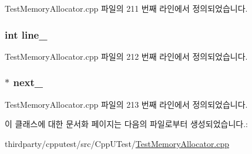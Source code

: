 Test\+Memory\+Allocator.\+cpp 파일의 211 번째 라인에서 정의되었습니다.

\subsubsection[{\texorpdfstring{line\+\_\+}{line_}}]{\setlength{\rightskip}{0pt plus 5cm}int line\+\_\+}\hypertarget{class_location_to_fail_alloc_node_ac515e5f5602db49593f96316f1b5c054}{}\label{class_location_to_fail_alloc_node_ac515e5f5602db49593f96316f1b5c054}


Test\+Memory\+Allocator.\+cpp 파일의 212 번째 라인에서 정의되었습니다.

\subsubsection[{\texorpdfstring{next\+\_\+}{next_}}]{$\ast$ next\+\_\+}\hypertarget{class_location_to_fail_alloc_node_a1d488315b4672de363b3dd44df78f2e8}{}\label{class_location_to_fail_alloc_node_a1d488315b4672de363b3dd44df78f2e8}


Test\+Memory\+Allocator.\+cpp 파일의 213 번째 라인에서 정의되었습니다.



이 클래스에 대한 문서화 페이지는 다음의 파일로부터 생성되었습니다.\+:\begin{DoxyCompactItemize}
\item 
thirdparty/cpputest/src/\+Cpp\+U\+Test/\hyperlink{_test_memory_allocator_8cpp}{Test\+Memory\+Allocator.\+cpp}\end{DoxyCompactItemize}
